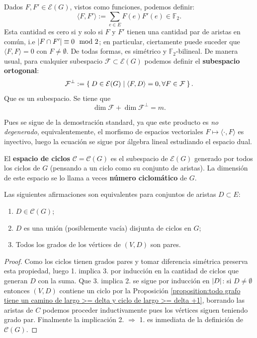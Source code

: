 \documentclass[../main.tex]{subfiles}
\begin{document}
Dados $F,F' \in \mathcal{E} (G)$, vistos como funciones, podemos definir:
\[
    \langle F, F' \rangle := \sum_{e \in E} F (e) F'(e) \in \mathbb{F}_2.
\]
Esta cantidad es cero si y solo si $F$ y $F'$ tienen una cantidad par de aristas en común, i.e $\left \vert F \cap F' \right \vert \equiv 0 \mod 2$; en particular, ciertamente puede suceder que $\langle F , F \rangle = 0$ con $F \neq \emptyset$. De todas formas, es simétrico y $\mathbb{F}_2$-bilineal.
De manera usual, para cualquier subespacio $\mathcal{F} \subset \mathcal{E}(G)$ podemos definir el \textbf{subespacio ortogonal}:
\[
    \mathcal{F}^\perp := \Set{D \in \mathcal{E}(G) | \langle F , D \rangle = 0, \\ \forall F \in \mathcal{F}}.
\]
Que es un subespacio. Se tiene que
\begin{equation}\label{eq:formula de la dimension para los subsespacios ortogonales de E(G)}
\dim \mathcal{F} + \dim \mathcal{F}^\perp = m.
\end{equation}

Pues se sigue de la demostración standard, ya que este producto es \textit{no degenerado}, equivalentemente, el morfismo de espacios vectoriales $F \mapsto \langle \cdot, F \rangle$ es inyectivo, luego la ecuación se sigue por álgebra lineal estudiando el espacio dual.

\begin{definition}
El \textbf{espacio de ciclos} $\mathcal{C} = \mathcal{C}(G)$ es el subespacio de $\mathcal{E}(G)$ generado por todos los ciclos de $G$ (pensando a un ciclo como su conjunto de aristas). La dimensión de este espacio se lo llama a veces \textbf{número ciclomático} de $G$.
\end{definition}

\begin{proposition}\label{proposition:apendice - definiciones equivalentes de elemento del subespacio de ciclos}
Las siguientes afirmaciones son equivalentes para conjuntos de aristas $D \subset E$:
\begin{enumerate}[1.]
\item $D \in \mathcal{C} (G)$;
\item $D$ es una unión (posiblemente vacía) disjunta de ciclos en $G$;
\item Todos los grados de los vértices de $(V,D)$ son pares.
\end{enumerate}
\end{proposition}
\begin{proof}
Como los ciclos tienen grados pares y tomar diferencia simétrica preserva esta propiedad, luego 1. implica 3. por inducción en la cantidad de ciclos que generan $D$ con la suma. Que 3. implica 2. se sigue por inducción en $\left \vert D \right \vert$: si $D \neq \emptyset$ entonces $(V,D)$ contiene un ciclo por la Proposición \ref{proposition:todo grafo tiene un camino de largo >= delta y ciclo de largo >= delta +1}, borrando las aristas de $C$ podemos proceder inductivamente pues los vértices siguen teniendo grado par. Finalmente la implicación 2. $\Rightarrow$ 1. es inmediata de la definición de $\mathcal{C}(G)$.
\end{proof}
\end{document}
